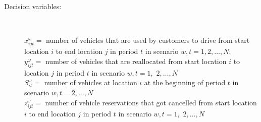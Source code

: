 \begin{description}
\item[Decision variables:] ~\par
$x_{i j t}^{\omega}=$ number of vehicles that are used by customers to drive from start location $i$ to end location $j$ in period $t$ in scenario $w, t=1,2, \ldots, N ;$\\
$y_{i j t}^{\omega}=$ number of vehicles that are reallocated from start location $i$ to location $j$ in period $t$ in scenario $w, t=1,$ $2, \ldots, N$\\
$S_{i t}^{\omega}=$ number of vehicles at location $i$ at the beginning of period $t$ in scenario $w, t=2, \ldots, N$\\
$z_{i j t}^{\omega}=$ number of vehicle reservations that got cancelled from start location $i$ to end location $j$ in period $t$ in scenario $w, t=1,$ $2, \ldots, N$\\
\end{description}
